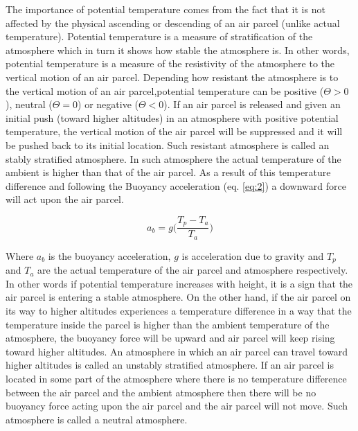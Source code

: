 \documentclass[a4paper,12pt]{article}
\numberwithin{equation}{section} %
\begin{document}
The importance of potential temperature comes from the fact that it is not affected by the physical ascending or descending of an air parcel (unlike actual temperature). Potential temperature is a measure of stratification of the atmosphere which in turn it shows how stable the atmosphere is. In other words, potential temperature is a measure of the resistivity of the atmosphere to the vertical motion of an air parcel. Depending how resistant the atmosphere is to the vertical motion of an air parcel,potential temperature can be positive ($\Theta > 0$), neutral ($\Theta = 0$) or negative ($\Theta < 0$). If an air parcel is released and given an initial push (toward higher altitudes) in an atmosphere with positive potential temperature, the vertical motion of the air parcel will be suppressed and it will be pushed back to its initial location. Such resistant atmosphere is called an stably stratified atmosphere. In such atmosphere the actual temperature of the ambient is higher than that of the air parcel. As a result of this temperature difference and following the Buoyancy acceleration (eq. \ref{eq:2}) a downward force will act upon the air parcel.

\vspace{0.5cm}
\begin{equation}\label{eq:2}
a_b = g\bigg(\frac{T_p - T_a}{T_a}\bigg)
\end{equation}

\vspace{0.25cm}

Where $a_b$ is the buoyancy acceleration, $g$ is acceleration due to gravity and $T_p$ and $T_a$ are the actual temperature of the air parcel and atmosphere respectively. In other words if potential temperature increases with height, it is a sign that the air parcel is entering a stable atmosphere. On the other hand, if the air parcel on its way to higher altitudes experiences a temperature difference in a way that the temperature inside the parcel is higher than the ambient temperature of the atmosphere, the buoyancy force will be upward and air parcel will keep rising toward higher altitudes. An atmosphere in which an air parcel can travel toward higher altitudes is called an unstably stratified atmosphere. If an air parcel is located in some part of the atmosphere where there is no temperature difference between the air parcel and the ambient atmosphere then there will be no buoyancy force acting upon the air parcel and the air parcel will not move. Such atmosphere is called a neutral atmosphere.
\end{document}
